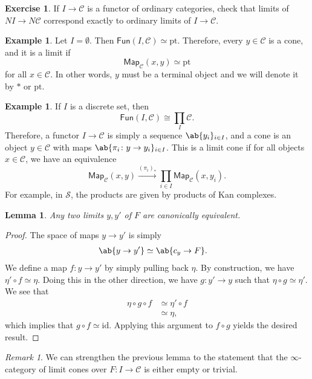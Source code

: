 \documentclass[10pt]{amsart}
\newtheorem{lem}[thm]{Lemma}
\theoremstyle{definition}
\newtheorem{exm}[thm]{Example}
\newtheorem{exer}[thm]{Exercise}
\theoremstyle{remark}
\newtheorem{rmk}[thm]{Remark}
\theoremstyle{plain}
\theoremstyle{definition}
\theoremstyle{remark}
\newcommand{\mc}[1]{\mathcal{#1}}
\newcommand{\mr}[1]{\mathrm{#1}}
\newcommand{\ms}[1]{\mathsf{#1}}
\newcommand{\1}{\mathbf{1}}
\newcommand{\2}{\mathbf{2}}
\newcommand{\3}{\mathbf{3}}
\begin{document}
\begin{exer}
    If $I \to \mc{C}$ is a functor of ordinary categories, check that limits of $NI \to N \mc{C}$ correspond exactly to ordinary limits of $I \to \mc{C}$.
\end{exer}

\begin{exm}
    Let $I = \emptyset$. Then $\ms{Fun}(I, \mc{C}) \simeq \mr{pt}$. Therefore, every $y \in \mc{C}$ is a cone, and it is a limit if
    \[ \ms{Map}_{\mc{C}}(x,y) \simeq \mr{pt} \]
    for all $x \in \mc{C}$. In other words, $y$ must be a terminal object and we will denote it by $*$ or $\mr{pt}$.
\end{exm}

\begin{exm}
    If $I$ is a discrete set, then 
    \[ \ms{Fun}(I, \mc{C}) \cong \prod_I \mc{C}. \]
    Therefore, a functor $I \to \mc{C}$ is simply a sequence $\ab\{y_i\}_{i \in I}$, and a cone is an object $y \in \mc{C}$ with maps $\ab\{\pi_i \colon y \to y_i \}_{i \in I}$. This is a limit cone if for all objects $x \in \mc{C}$, we have an equivalence
    \[ \ms{Map}_{\mc{C}}(x,y) \xrightarrow{(\pi_i)_*} \prod_{i \in I} \ms{Map}_{\mc{C}}(x, y_i). \]
    For example, in $\mc{S}$, the products are given by products of Kan complexes.
\end{exm}

\begin{lem}
    Any two limits $y, y'$ of $F$ are canonically equivalent.
\end{lem}

\begin{proof}
    The space of maps $y \to y'$ is simply
    \begin{align*}
        \ab\{ y\to y' \} &\simeq \ab\{c_y \to F \}.
    \end{align*}
    We define a map $f \colon y \to y'$ by simply pulling back $\eta$. By construction, we have $\eta' \circ f \simeq \eta$. Doing this in the other direction, we have $g \colon y' \to y$ such that $\eta \circ g \simeq \eta'$. We see that 
    \begin{align*}
        \eta \circ g \circ f &\simeq \eta' \circ f \\
        &\simeq \eta,
    \end{align*}
    which implies that $g \circ f \simeq \mr{id}$. Applying this argument to $f \circ g$ yields the desired result.
\end{proof}

\begin{rmk}
    We can strengthen the previous lemma to the statement that the $\infty$-category of limit cones over $F \colon I \to \mc{C}$ is either empty or trivial.
\end{rmk}
\end{document}
